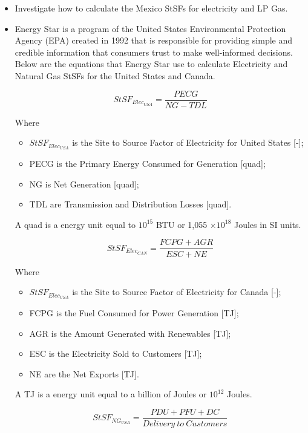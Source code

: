 \begin{enumerate*}
\begin{itemize}
\item Investigate how to calculate the Mexico StSFs for electricity and LP Gas. 
\item Energy Star is a program of the United States Environmental Protection Agency (EPA) created in 1992 that is responsible for providing simple and credible information that consumers trust to make well-informed decisions. Below are the equations that Energy Star use to calculate Electricity and Natural Gas StSFs for the United States and Canada.


\begin{equation}
StSF_{Elec_{USA}} = \frac{PECG}{NG - TDL}
\end{equation}

Where
\begin{itemize}
\item $StSF_{Elec_{USA}}$ is the Site to Source Factor of Electricity for United States [-];
\item PECG is  the Primary Energy Consumed for Generation [quad];
\item NG is Net Generation [quad];
\item TDL are Transmission and Distribution Losses [quad].
\end{itemize}

A quad is a energy unit equal to $10^15$ BTU or  1,055 $\times 10^18$ Joules in SI units.

\begin{equation}
StSF_{Elec_{CAN}} = \frac{ FCPG +  AGR}{ESC + NE}
\end{equation}

Where
\begin{itemize}
\item $StSF_{Elec_{USA}}$ is the Site to Source Factor of Electricity for Canada [-];
\item FCPG  is the Fuel Consumed for Power Generation [TJ]; 
\item AGR is the Amount Generated with Renewables [TJ];
\item ESC is the Electricity Sold to Customers [TJ];
\item NE are the Net Exports [TJ].
\end{itemize}


A TJ is a energy unit equal to a billion of Joules or $10^12$ Joules.

\begin{equation}
StSF_{NG_{USA}} = \frac{ PDU + PFU + DC}{Delivery~to~Customers}
\end{equation}


\end{itemize}
\end{enumerate*}
